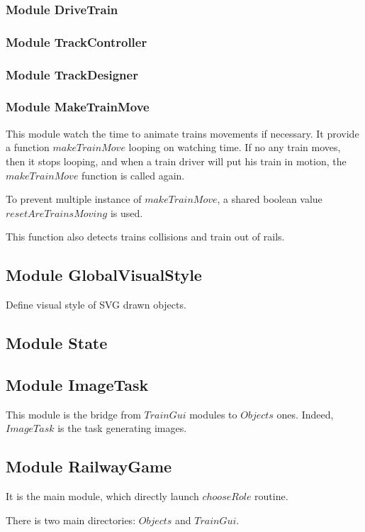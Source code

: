 \documentclass{article}
\begin{document}
			\subsubsection{Module DriveTrain}
			\subsubsection{Module TrackController}
			\subsubsection{Module TrackDesigner}
			\subsubsection{Module MakeTrainMove}
				This module watch the time to animate trains movements if necessary. It provide a function $makeTrainMove$ looping on watching time. If no any train moves, then it stops looping, and when a train driver will put his train in motion, the $makeTrainMove$ function is called again.

				To prevent multiple instance of $makeTrainMove$, a shared boolean value $resetAreTrainsMoving$ is used.

				This function also detects trains collisions and train out of rails.
		\subsection{Module GlobalVisualStyle}
			Define visual style of SVG drawn objects.
		\subsection{Module State}
		\subsection{Module ImageTask}
			This module is the bridge from $TrainGui$ modules to $Objects$ ones. Indeed, $ImageTask$ is the task generating images.
		\subsection{Module RailwayGame}
			It is the main module, which directly launch $chooseRole$ routine.




		There is two main directories: $Objects$ and $TrainGui$.
\end{document}
